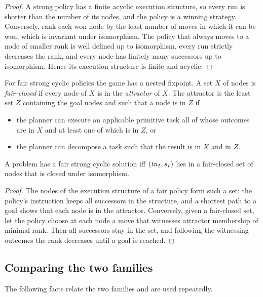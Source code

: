 \begin{proof}
  A strong policy has a finite acyclic execution structure, so every run is shorter than the
  number of its nodes, and the policy is a winning strategy. Conversely, rank each won node by the
  least number of moves in which it can be won, which is invariant under isomorphism. The policy
  that always moves to a node of smaller rank is well defined up to isomorphism, every run strictly
  decreases the rank, and every node has finitely many successors up to isomorphism. Hence its
  execution structure is finite and acyclic.
\end{proof}

For fair strong cyclic policies the game has a nested fixpoint. A set $X$ of nodes is
\emph{fair-closed} if every node of $X$ is in the \emph{attractor} of $X$. The attractor is the
least set $Z$ containing the goal nodes and such that a node is in $Z$ if
\begin{itemize}
  \item the planner can execute an applicable primitive task all of whose outcomes are in $X$ and
    at least one of which is in $Z$, or
  \item the planner can decompose a task such that the result is in $X$ and in $Z$.
\end{itemize}

\begin{theorem}\label{thm:mp-fair-game}
  A problem has a fair strong cyclic solution iff $(\mathit{tn}_I,s_I)$ lies in a fair-closed set of nodes
  that is closed under isomorphism.
\end{theorem}

\begin{proof}
  The nodes of the execution structure of a fair policy form such a set: the policy's
  instruction keeps all successors in the structure, and a shortest path to a goal shows that each
  node is in the attractor. Conversely, given a fair-closed set, let the policy choose at each
  node a move that witnesses attractor membership of minimal rank. Then all successors stay in
  the set, and following the witnessing outcomes the rank decreases until a goal is reached.
\end{proof}

\subsection{Comparing the two families}

The following facts relate the two families and are used repeatedly.

